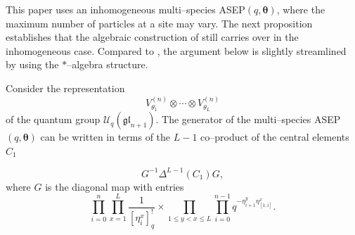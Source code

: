 \documentclass{ximera}
\begin{document}
This paper uses an inhomogeneous multi--species ASEP$(q,\boldsymbol\theta)$, where the maximum number of particles at a site may vary. The next proposition establishes that the algebraic construction of \cite{Kuan-IMRN} still carries over in the inhomogeneous case. Compared to \cite{Kuan-IMRN}, the argument below is slightly streamlined by using the $*$--algebra structure. 

\begin{prop}
Consider the representation 
$$
V_{\theta_1}^{(n)} \otimes \cdots \otimes V_{\theta_L}^{(n)}
$$
of the quantum group $\mathcal{U}_q(\mathfrak{gl}_{n+1})$. 
The generator of the multi--species ASEP$(q,\boldsymbol\theta)$ can be written in terms of the $L-1$ co--product of the central elements $C_1$ 

$$
G^{-1}\Delta^{L-1}(C_1)G,
$$
where $G$ is the diagonal map with entries
\begin{equation*}
\prod_{i=0}^{n} \prod_{x=1}^{L} \frac{1}{\left[\eta_{i}^{x}\right]_{q}^{!}} \times \prod_{1 \leq y<x \leq L} \prod_{i=0}^{n-1} q^{-\eta_{i+1}^{y} \eta_{[1, i]}^{x}} .
\end{equation*}
\end{prop}
\end{document}
